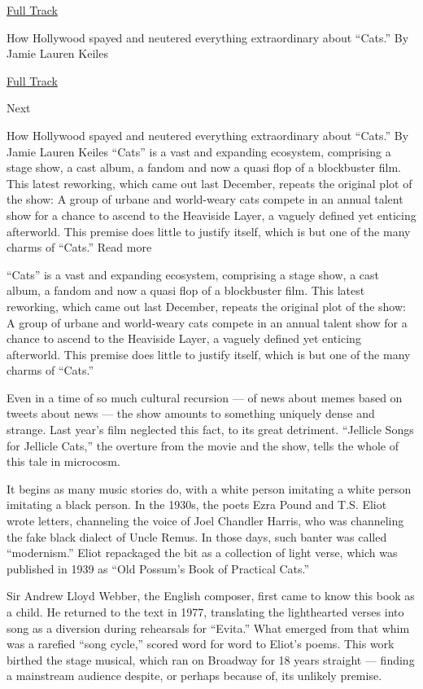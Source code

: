 \href{https://open.spotify.com/track/1jCDF7sWqYmOr2Ll5WkNuT?si=wvWpEVF3QSm-cSiNh90NSg}{
Full Track}

How Hollywood spayed and neutered everything extraordinary about
``Cats.'' By Jamie Lauren Keiles

\href{https://open.spotify.com/track/1jCDF7sWqYmOr2Ll5WkNuT?si=wvWpEVF3QSm-cSiNh90NSg}{Full
Track }

Next

How Hollywood spayed and neutered everything extraordinary about
``Cats.'' By Jamie Lauren Keiles ``Cats'' is a vast and expanding
ecosystem, comprising a stage show, a cast album, a fandom and now a
quasi flop of a blockbuster film. This latest reworking, which came out
last December, repeats the original plot of the show: A group of urbane
and world-weary cats compete in an annual talent show for a chance to
ascend to the Heaviside Layer, a vaguely defined yet enticing
afterworld. This premise does little to justify itself, which is but one
of the many charms of ``Cats.'' Read more

``Cats'' is a vast and expanding ecosystem, comprising a stage show, a
cast album, a fandom and now a quasi flop of a blockbuster film. This
latest reworking, which came out last December, repeats the original
plot of the show: A group of urbane and world-weary cats compete in an
annual talent show for a chance to ascend to the Heaviside Layer, a
vaguely defined yet enticing afterworld. This premise does little to
justify itself, which is but one of the many charms of ``Cats.''

Even in a time of so much cultural recursion --- of news about memes
based on tweets about news --- the show amounts to something uniquely
dense and strange. Last year's film neglected this fact, to its great
detriment. ``Jellicle Songs for Jellicle Cats,'' the overture from the
movie and the show, tells the whole of this tale in microcosm.

It begins as many music stories do, with a white person imitating a
white person imitating a black person. In the 1930s, the poets Ezra
Pound and T.S. Eliot wrote letters, channeling the voice of Joel
Chandler Harris, who was channeling the fake black dialect of Uncle
Remus. In those days, such banter was called ``modernism.'' Eliot
repackaged the bit as a collection of light verse, which was published
in 1939 as ``Old Possum's Book of Practical Cats.''

Sir Andrew Lloyd Webber, the English composer, first came to know this
book as a child. He returned to the text in 1977, translating the
lighthearted verses into song as a diversion during rehearsals for
``Evita.'' What emerged from that whim was a rarefied ``song cycle,''
scored word for word to Eliot's poems. This work birthed the stage
musical, which ran on Broadway for 18 years straight --- finding a
mainstream audience despite, or perhaps because of, its unlikely
premise.

